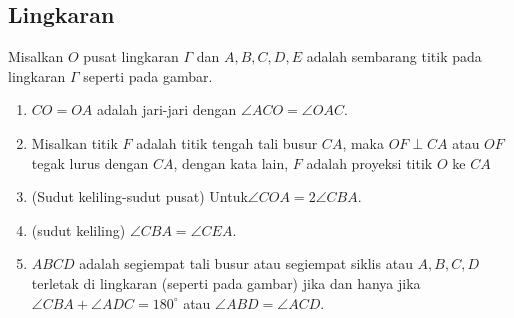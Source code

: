 \subsection{Lingkaran}

\begin{center}
\end{center}

    
Misalkan $O$ pusat lingkaran $\Gamma$ dan $A,B,C,D,E$ adalah sembarang titik pada lingkaran $\Gamma$ seperti pada gambar.
\begin{enumerate}
    \item $CO=OA$ adalah jari-jari dengan $\angle ACO = \angle OAC$.
    \item Misalkan titik $F$ adalah titik tengah tali busur $CA$, maka $OF \perp CA$ atau $OF$ tegak lurus dengan $CA$, dengan kata lain, $F$ adalah proyeksi titik $O$ ke $CA$
    \item (Sudut keliling-sudut pusat) Untuk$\angle COA = 2\angle CBA$.
    \item (sudut keliling) $\angle CBA = \angle CEA$.
    \item $ABCD$ adalah segiempat tali busur atau segiempat siklis  atau $A,B,C,D$ terletak di lingkaran (seperti pada gambar) jika dan hanya jika $\angle CBA + \angle ADC = 180^\circ$ atau $\angle ABD = \angle ACD$.
\end{enumerate}

